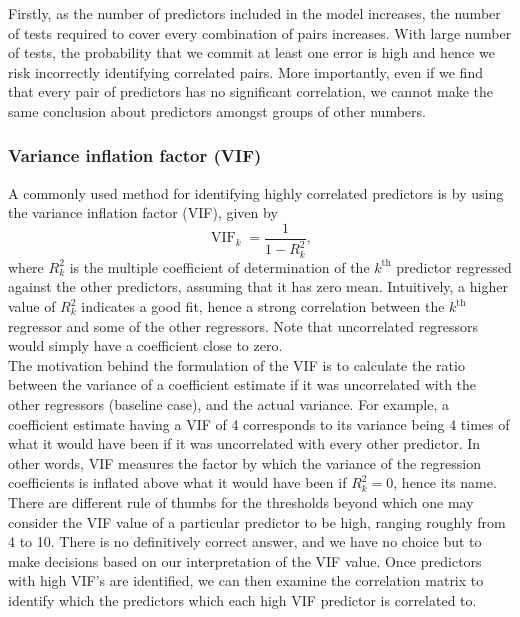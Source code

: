 \documentclass[12pt]{article}
\DeclareMathOperator{\vif}{VIF}
\begin{document}
	Firstly, as the number of predictors included in the model increases, the number of tests required to cover every combination of pairs increases. With large number of tests, the probability that we commit at least one error is high and hence we risk incorrectly identifying correlated pairs. More importantly, even if we find that every pair of predictors has no significant correlation, we cannot make the same conclusion about predictors amongst groups of other numbers. 
	
	\subsubsection{Variance inflation factor (VIF)}
	A commonly used method for identifying highly correlated predictors is by using the variance inflation factor (VIF), given by
	$$\vif_k=\frac{1}{1-R_{k}^2},$$
	where $R^2_k$ is the multiple coefficient of determination of the $k^{\text{th}}$ predictor regressed against the other predictors, assuming that it has zero mean. Intuitively, a higher value of $R^2_k$ indicates a good fit, hence a strong correlation between the $k^{\text{th}}$ regressor and some of the other regressors. Note that uncorrelated regressors would simply have a coefficient close to zero. \\
	
	The motivation behind the formulation of the VIF is to calculate the ratio between the variance of a coefficient estimate if it was uncorrelated with the other regressors (baseline case), and the actual variance. For example, a coefficient estimate having a VIF of 4 corresponds to its variance being 4 times of what it would have been if it was uncorrelated with every other predictor. In other words, VIF measures the factor by which the variance of the regression coefficients is inflated above what it would have been if $R_k^2=0$, hence its name. \\
	
	There are different rule of thumbs for the thresholds beyond which one may consider the VIF value of a particular predictor to be high, ranging roughly from 4 to 10. There is no definitively correct answer, and we have no choice but to make decisions based on our interpretation of the VIF value. Once predictors with high VIF's are identified, we can then examine the correlation matrix to identify which the predictors which each high VIF predictor is correlated to.
	
\end{document}
